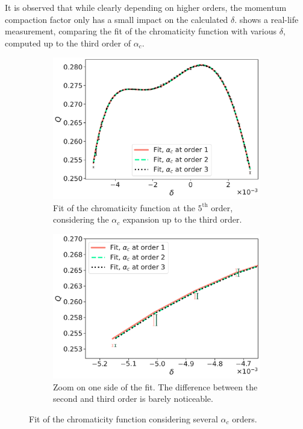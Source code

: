 It is observed that while clearly depending on higher orders, the momentum compaction factor only
has a small impact on the calculated $\delta$.
 shows a real-life 
measurement, comparing the fit of the chromaticity function with various $\delta$, computed up to
the third order of $\alpha_c$.

\begin{figure}[!htb]
    \centering
    \begin{subfigure}[t]{0.48\textwidth}
        \centering
        \includegraphics[width=\textwidth]{images/chroma_function_alpha_c.pdf}
        \caption{Fit of the chromaticity function at the $5^{\text{th}}$ order, considering the
        $\alpha_c$ expansion up to the third order.}
    \end{subfigure}
    \hfill
    \begin{subfigure}[t]{0.48\textwidth}
        \centering
        \includegraphics[width=\textwidth]{images/chroma_function_alpha_c_zoom.pdf}
        \caption{Zoom on one side of the fit. The difference between the second and third order
        is barely noticeable.}
    \end{subfigure}
    \caption{Fit of the chromaticity function considering several $\alpha_c$ orders.}
    \label{fig:decapoles:chromaticity:momentum_compaction_factor_chroma_meas}
\end{figure}

